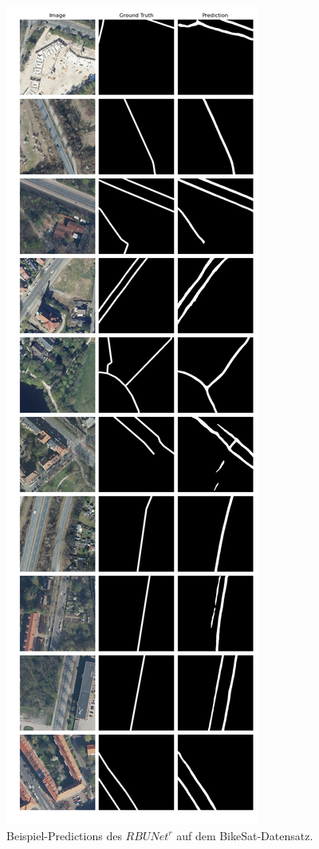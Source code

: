 \begin{figure}
	\centering
	\includegraphics[width=.41\textwidth]{Bilder/Samples-BikeSat/rbunet-r.png} 
	\caption{Beispiel-Predictions des $RBUNet^r$ auf dem BikeSat-Datensatz.}
	\label{fig:bikesat-samples-rbunet-r}
\end{figure}

